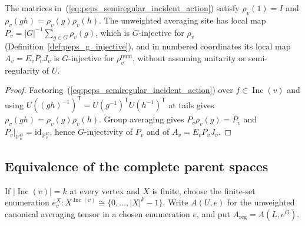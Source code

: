\begin{lemma}%
    \label{thm:peps_semiregular_averaging_g_injective}
    \leanok
    The matrices in~(\ref{eq:peps_semiregular_incident_action}) satisfy
    $\rho_v(1)=I$ and $\rho_v(gh)=\rho_v(g)\rho_v(h)$. The unweighted
    averaging site has local map $P_v=|G|^{-1}\sum_{g\in G}\rho_v(g)$, which
    is $G$-injective for $\rho_v$ (Definition~\ref{def:peps_g_injective}), and
    in numbered coordinates its local map $A_v=E_vP_vJ_v$ is $G$-injective for
    $\rho_v^{\mathrm{num}}$, without assuming unitarity or semi-regularity of $U$.
\end{lemma}
\begin{proof}\leanok
    Factoring~(\ref{eq:peps_semiregular_incident_action}) over
    $f\in\operatorname{Inc}(v)$ and using
    $U((gh)^{-1})^{\mathsf T}=U(g^{-1})^{\mathsf T}U(h^{-1})^{\mathsf T}$ at
    tails gives $\rho_v(gh)=\rho_v(g)\rho_v(h)$. Group averaging gives
    $P_v\rho_v(g)=P_v$ and $P_v|_{\mathcal V_v^G}=\mathrm{id}_{\mathcal V_v^G}$,
    hence $G$-injectivity of $P_v$ and of $A_v=E_vP_vJ_v$.
\end{proof}

\subsection{Equivalence of the complete parent spaces}

\begin{definition}%
    \label{def:peps_semiregular_incident_enumeration}
    \leanok
    If $|\operatorname{Inc}(v)|=k$ at every vertex and $X$ is finite,
    choose the finite-set enumeration
    $e^X_v:X^{\operatorname{Inc}(v)}\cong\{0,\ldots,|X|^k-1\}$.
    Write $A(U,e)$ for the unweighted canonical averaging tensor in a
    chosen enumeration $e$, and put $A_{\mathrm{reg}}=A(L,e^G)$.
\end{definition}

